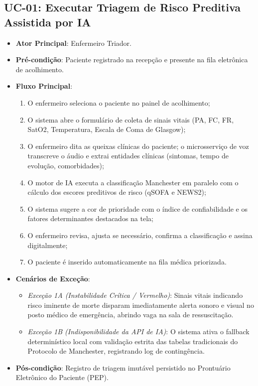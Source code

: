 \documentclass[12pt,oneside,a4paper,article]{abntex2}
\begin{document}
\subsection{UC-01: Executar Triagem de Risco Preditiva Assistida por IA}
\begin{itemize}[noitemsep]
  \item \textbf{Ator Principal}: Enfermeiro Triador.
  \item \textbf{Pré-condição}: Paciente registrado na recepção e presente na fila eletrônica de acolhimento.
  \item \textbf{Fluxo Principal}:
  \begin{enumerate}[noitemsep]
    \item O enfermeiro seleciona o paciente no painel de acolhimento;
    \item O sistema abre o formulário de coleta de sinais vitais (PA, FC, FR, SatO2, Temperatura, Escala de Coma de Glasgow);
    \item O enfermeiro dita as queixas clínicas do paciente; o microsserviço de voz transcreve o áudio e extrai entidades clínicas (sintomas, tempo de evolução, comorbidades);
    \item O motor de IA executa a classificação Manchester em paralelo com o cálculo dos escores preditivos de risco (qSOFA e NEWS2);
    \item O sistema sugere a cor de prioridade com o índice de confiabilidade e os fatores determinantes destacados na tela;
    \item O enfermeiro revisa, ajusta se necessário, confirma a classificação e assina digitalmente;
    \item O paciente é inserido automaticamente na fila médica priorizada.
  \end{enumerate}
  \item \textbf{Cenários de Exceção}:
  \begin{itemize}[noitemsep]
    \item \textit{Exceção 1A (Instabilidade Crítica / Vermelho)}: Sinais vitais indicando risco iminente de morte disparam imediatamente alerta sonoro e visual no posto médico de emergência, abrindo vaga na sala de ressuscitação.
    \item \textit{Exceção 1B (Indisponibilidade da API de IA)}: O sistema ativa o fallback determinístico local com validação estrita das tabelas tradicionais do Protocolo de Manchester, registrando log de contingência.
  \end{itemize}
  \item \textbf{Pós-condição}: Registro de triagem imutável persistido no Prontuário Eletrônico do Paciente (PEP).
\end{itemize}
\end{document}
